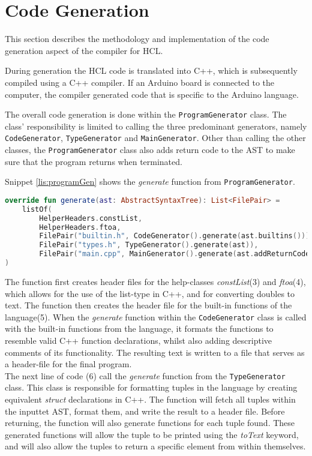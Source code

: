 \section{Code Generation}
This section describes the methodology and implementation of the code generation aspect of the compiler for HCL. 

During generation the HCL code is translated into C++, which is subsequently compiled using a C++ compiler.
If an Arduino board is connected to the computer, the compiler generated code that is specific to the Arduino language. 

The overall code generation is done within the \texttt{ProgramGenerator} class.
The class' responsibility is limited to calling the three predominant generators, namely \texttt{CodeGenerator}, \texttt{TypeGenerator} and \texttt{MainGenerator}.
Other than calling the other classes, the \texttt{ProgramGenerator} class also adds return code to the AST to make sure that the program returns when terminated. 

Snippet \ref{lis:programGen} shows the \textit{generate} function from \texttt{ProgramGenerator}.

\begin{lstlisting}[language=Kotlin,label=lis:programGen,caption=The implementation of \textit{generate} in \texttt{ProgramGenerator}.]
override fun generate(ast: AbstractSyntaxTree): List<FilePair> = 
	listOf(
		HelperHeaders.constList,
		HelperHeaders.ftoa,
		FilePair("builtin.h", CodeGenerator().generate(ast.builtins())),
		FilePair("types.h", TypeGenerator().generate(ast)),
		FilePair("main.cpp", MainGenerator().generate(ast.addReturnCode().notBuiltins()))
)
\end{lstlisting}

The function first creates header files for the help-classes \textit{constList}(3) and \textit{ftoa}(4), which allows for the use of the list-type in C++, and for converting doubles to text. 
The function then creates the header file for the built-in functions of the language(5).
When the \textit{generate} function within the \texttt{CodeGenerator} class is called with the built-in functions from the language, it formats the functions to resemble valid C++ function declarations, whilst also adding descriptive comments of its functionality.
The resulting text is written to a file that serves as a header-file for the final program. \\
The next line of code (6) call the \textit{generate} function from the \texttt{TypeGenerator} class.
This class is responsible for formatting tuples in the language by creating equivalent \textit{struct} declarations in C++.
The function will fetch all tuples within the inputtet AST, format them, and write the result to a header file.
Before returning, the function will also generate functions for each tuple found.
These generated functions will allow the tuple to be printed using the \textit{toText} keyword, and will also allow the tuples to return a specific element from within themselves.\\

